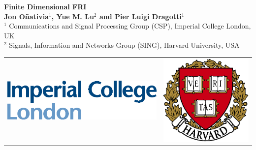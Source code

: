 \documentclass[a0,portrait]{a0poster}
\begin{document}
\sffamily
\normalsize



\begin{minipage}[b][12cm][c]{0.65\linewidth}
\sffamily
\veryHuge \color{NavyBlue} \textbf{Finite Dimensional FRI} \color{Black}\\[2cm] %
\huge \textbf{Jon Oñativia$^1$, Yue M. Lu$^2$ and Pier Luigi Dragotti$^1$}\\[1cm]
\large $^1$ Communications and Signal Processing Group (CSP), Imperial College London, UK\\[0.4cm]
\large $^2$ Signals, Information and Networks Group (SING), Harvard University, USA\\[0.4cm]
\end{minipage}
%
\begin{minipage}[b][12cm][t]{0.35\linewidth}
\begin{flushright}
\begin{tabular}{m{16cm} m{8cm}}
\vspace{0pt} \includegraphics[width=14cm]{imperial_logo}  &
\vspace{0pt} \includegraphics[width=8cm]{harvard_logo}
\end{tabular}
\end{flushright}
\end{minipage}
\end{document}
